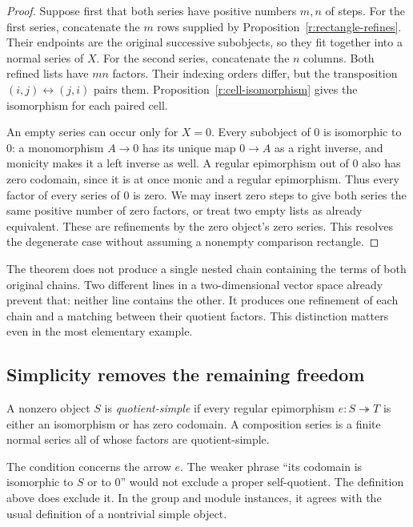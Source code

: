 \begin{proof}
Suppose first that both series have positive numbers $m,n$ of steps.
For the first series, concatenate the $m$ rows supplied by
Proposition~\ref{r:rectangle-refines}.  Their endpoints are the original
successive subobjects, so they fit together into a normal series of $X$.
For the second series, concatenate the $n$ columns.  Both refined lists
have $mn$ factors.  Their indexing orders differ, but the transposition
$(i,j)\leftrightarrow(j,i)$ pairs them.  Proposition~\ref{r:cell-isomorphism}
gives the isomorphism for each paired cell.

An empty series can occur only for $X=0$.  Every subobject of $0$ is
isomorphic to $0$: a monomorphism $A\to0$ has its unique map $0\to A$ as
a right inverse, and monicity makes it a left inverse as well.  A regular
epimorphism out of $0$ also has zero codomain, since it is at once monic
and a regular epimorphism.  Thus every factor of every series of $0$ is
zero.  We may insert zero steps to give both series the same positive
number of zero factors, or treat two empty lists as already equivalent.
These are refinements by the zero object's zero series.  This resolves
the degenerate case without assuming a nonempty comparison rectangle.
\end{proof}

The theorem does not produce a single nested chain containing the terms
of both original chains.  Two different lines in a two-dimensional vector
space already prevent that: neither line contains the other.  It produces
one refinement of each chain and a matching between their quotient
factors.  This distinction matters even in the most elementary example.

\subsection{Simplicity removes the remaining freedom}

\begin{definition}
\label{j:simple}
A nonzero object $S$ is \emph{quotient-simple} if every regular
epimorphism $e:S\twoheadrightarrow T$ is either an isomorphism or has
zero codomain.  A composition series is a finite normal series all of
whose factors are quotient-simple.
\end{definition}

The condition concerns the arrow $e$.  The weaker phrase ``its codomain
is isomorphic to $S$ or to $0$'' would not exclude a proper self-quotient.
The definition above does exclude it.  In the group and module instances,
it agrees with the usual definition of a nontrivial simple object.

